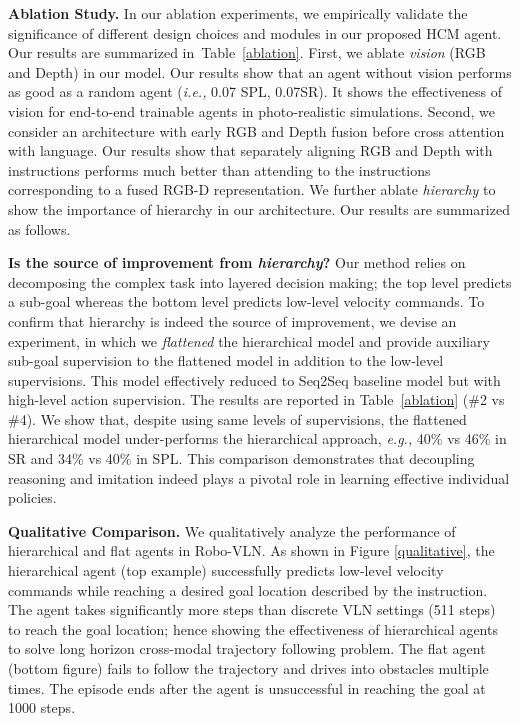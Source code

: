 \documentclass[letter, 10pt, conference]{ieeeconf}
\begin{document}
\textbf{Ablation Study.}
In our ablation experiments, we empirically validate the significance of different design choices and modules in our proposed HCM agent. Our results are summarized in~Table~\ref{ablation}. First, we ablate \textit{vision} (RGB and Depth) in our model. Our results show that an agent without vision performs as good as a random agent (\textit{i.e.,} 0.07 SPL, 0.07SR). It shows the effectiveness of vision for end-to-end trainable agents in photo-realistic simulations. Second, we consider an architecture with early RGB and Depth fusion before cross attention with language. Our results show that separately aligning RGB and Depth with instructions performs much better than attending to the instructions corresponding to a fused RGB-D representation. We further ablate \textit{hierarchy} to show the importance of hierarchy in our architecture. Our results are summarized as follows.

\textbf{Is the source of improvement from \textit{hierarchy}?}
Our method relies on decomposing the complex task into layered decision making; the top level predicts a sub-goal whereas the bottom level predicts low-level velocity commands.
To confirm that hierarchy is indeed the source of improvement, we devise an experiment, in which we \textit{flattened} the hierarchical model and provide auxiliary sub-goal supervision to the flattened model in addition to the low-level supervisions.
This model effectively reduced to Seq2Seq baseline model but with high-level action supervision. 
The results are reported in Table~\ref{ablation} (\#2 vs \#4). 
We show that, despite using same levels of supervisions, the flattened hierarchical model under-performs the hierarchical approach, \textit{e.g.,} 40\% vs 46\% in SR and 34\% vs 40\% in SPL. 
This comparison demonstrates that decoupling reasoning and imitation indeed plays a pivotal role in learning effective individual policies.

\textbf{Qualitative Comparison.}
We qualitatively analyze the performance of hierarchical and flat agents in Robo-VLN. As shown in Figure \ref{qualitative}, the hierarchical agent (top example) successfully predicts low-level velocity commands while reaching a desired goal location described by the instruction. The agent takes significantly more steps than discrete VLN settings (511 steps) to reach the goal location; hence showing the effectiveness of hierarchical agents to solve long horizon cross-modal trajectory following problem. The flat agent (bottom figure) fails to follow the trajectory and drives into obstacles multiple times. The episode ends after the agent is unsuccessful in reaching the goal at 1000 steps.
\end{document}
